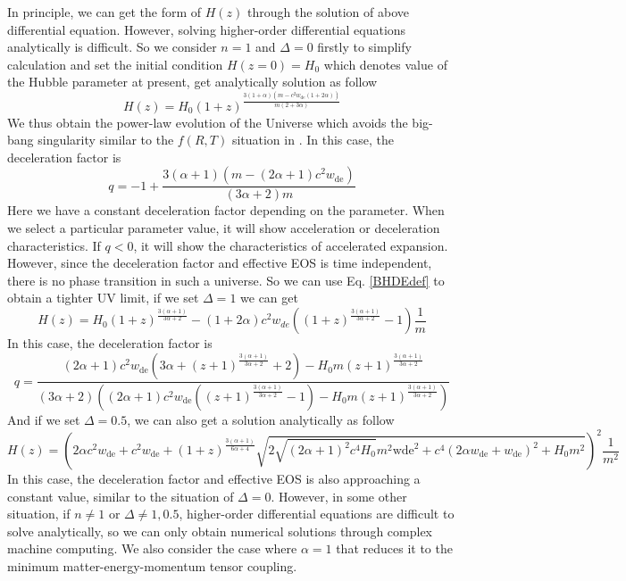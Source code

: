 \documentclass[a4paper,fleqn]{cas-sc}
\begin{document}
In principle, we can get the form of $H(z)$ through the solution of above differential equation. However, solving higher-order differential equations analytically is difficult. So we consider $n=1$ and $\Delta=0$ firstly to simplify calculation and set the initial condition $H(z=0)=H_0$ which denotes value of the Hubble parameter at present, get analytically solution as follow
\begin{equation}
    H(z)= H_0 (1+z)^{\frac{3 (1+\alpha) \left(m-c^2 w_\text{de}(1+2\alpha)\right)}{m(2+3\alpha)}}
\end{equation}
We thus obtain the power-law evolution of the Universe which avoids the big-bang singularity similar to the $f(R,T)$ situation in \cite{singhStatefinderDiagnosisHolographic2016}. In this case, the deceleration factor is
\begin{equation}
    q = -1+\frac{3 (\alpha +1) \left(m-(2 \alpha +1) c^2 w_\text{de}\right)}{(3 \alpha +2) m}
\end{equation}
Here we have a constant deceleration factor depending on the parameter. When we select a particular parameter value, it will show acceleration or deceleration characteristics. If $q<0$, it will show the characteristics of accelerated expansion. However, since the deceleration factor and effective EOS is time independent, there is no phase transition in such a universe. So we can use Eq. \eqref{BHDEdef} to obtain a tighter UV limit, if we set $\Delta=1$ we can get 
\begin{equation}
    H(z)= H_0 (1+z)^{\frac{3 (\alpha +1)}{3\alpha +2}}-(1+2 \alpha) c^2 w_{de} \left((1+z)^{\frac{3 (\alpha +1)}{3\alpha +2}}-1\right)\frac{1}{m}
\end{equation}
In this case, the deceleration factor is
\begin{equation}
    q=\frac{(2 \alpha +1) c^2 w_\text{de} \left(3 \alpha +(z+1)^{\frac{3 (\alpha +1)}{3 \alpha +2}}+2\right)-H_0 m (z+1)^{\frac{3 (\alpha +1)}{3 \alpha +2}}}{(3 \alpha +2) \left((2 \alpha +1) c^2 w_\text{de} \left((z+1)^{\frac{3 (\alpha +1)}{3 \alpha +2}}-1\right)-H_0 m (z+1)^{\frac{3 (\alpha +1)}{3 \alpha +2}}\right)}
\end{equation}
And if we set $\Delta=0.5$, we can also get a solution analytically as follow
\begin{equation}
    H(z)= \left(2 \alpha  c^2 w_\text{de}+c^2 w_\text{de}+(1+z)^{\frac{3 (\alpha +1)}{6 \alpha +4}}\sqrt{2 \sqrt{(2 \alpha +1)^2 c^4 H_0} m^2 \text{wde}^2+c^4 (2 \alpha  w_\text{de}+w_\text{de})^2+H_0 m^2}\right)^2 \frac{1}{m^2}
\end{equation}
In this case, the deceleration factor and effective EOS is also approaching a constant value, similar to the situation of $\Delta = 0$.
However, in some other situation, if $n \neq 1$ or $\Delta \neq 1,0.5$, higher-order differential equations are difficult to solve analytically, so we can only obtain numerical solutions through complex machine computing. We also consider the case where $\alpha=1$ that reduces it to the minimum matter-energy-momentum tensor coupling.
\end{document}
